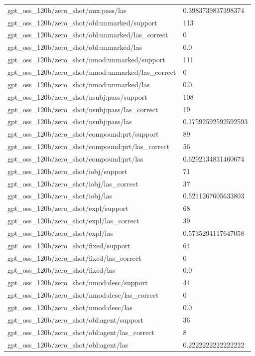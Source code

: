 \begin{tabular}{ll}
gpt\_oss\_120b/zero\_shot/aux:pass/las & 0.3983739837398374 \\
gpt\_oss\_120b/zero\_shot/obl:unmarked/support & 113 \\
gpt\_oss\_120b/zero\_shot/obl:unmarked/las\_correct & 0 \\
gpt\_oss\_120b/zero\_shot/obl:unmarked/las & 0.0 \\
gpt\_oss\_120b/zero\_shot/nmod:unmarked/support & 111 \\
gpt\_oss\_120b/zero\_shot/nmod:unmarked/las\_correct & 0 \\
gpt\_oss\_120b/zero\_shot/nmod:unmarked/las & 0.0 \\
gpt\_oss\_120b/zero\_shot/nsubj:pass/support & 108 \\
gpt\_oss\_120b/zero\_shot/nsubj:pass/las\_correct & 19 \\
gpt\_oss\_120b/zero\_shot/nsubj:pass/las & 0.17592592592592593 \\
gpt\_oss\_120b/zero\_shot/compound:prt/support & 89 \\
gpt\_oss\_120b/zero\_shot/compound:prt/las\_correct & 56 \\
gpt\_oss\_120b/zero\_shot/compound:prt/las & 0.6292134831460674 \\
gpt\_oss\_120b/zero\_shot/iobj/support & 71 \\
gpt\_oss\_120b/zero\_shot/iobj/las\_correct & 37 \\
gpt\_oss\_120b/zero\_shot/iobj/las & 0.5211267605633803 \\
gpt\_oss\_120b/zero\_shot/expl/support & 68 \\
gpt\_oss\_120b/zero\_shot/expl/las\_correct & 39 \\
gpt\_oss\_120b/zero\_shot/expl/las & 0.5735294117647058 \\
gpt\_oss\_120b/zero\_shot/fixed/support & 64 \\
gpt\_oss\_120b/zero\_shot/fixed/las\_correct & 0 \\
gpt\_oss\_120b/zero\_shot/fixed/las & 0.0 \\
gpt\_oss\_120b/zero\_shot/nmod:desc/support & 44 \\
gpt\_oss\_120b/zero\_shot/nmod:desc/las\_correct & 0 \\
gpt\_oss\_120b/zero\_shot/nmod:desc/las & 0.0 \\
gpt\_oss\_120b/zero\_shot/obl:agent/support & 36 \\
gpt\_oss\_120b/zero\_shot/obl:agent/las\_correct & 8 \\
gpt\_oss\_120b/zero\_shot/obl:agent/las & 0.2222222222222222 \\

\end{tabular}
